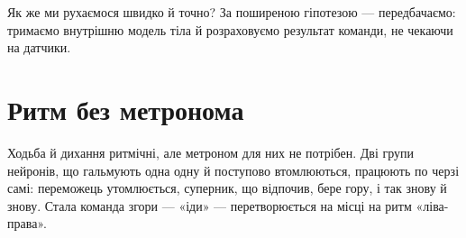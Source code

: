 Як же ми рухаємося швидко й точно? За поширеною гіпотезою --- передбачаємо: тримаємо внутрішню модель тіла й розраховуємо результат команди, не чекаючи на датчики.

\section*{Ритм без метронома}

Ходьба й дихання ритмічні, але метроном для них не потрібен. Дві групи нейронів, що гальмують одна одну й поступово втомлюються, працюють по черзі самі: переможець утомлюється, суперник, що відпочив, бере гору, і так знову й знову. Стала команда згори --- «іди» --- перетворюється на місці на ритм «ліва-права».

